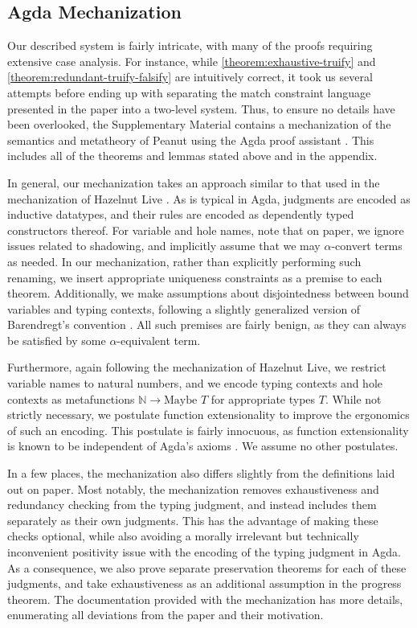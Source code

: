 \subsection{Agda Mechanization}
\label{sec:agda}

Our described system is fairly intricate, with many of the proofs
requiring extensive case analysis.
%
For instance, while \autoref{theorem:exhaustive-truify} and
\autoref{theorem:redundant-truify-falsify} are intuitively correct, it
took us several attempts before ending up with separating the match
constraint language presented in the paper into a two-level system.
%
%
Thus, to ensure
no details have been overlooked, the Supplementary Material contains a
mechanization of the semantics and metatheory of Peanut using the Agda
proof assistant \cite{norell:thesis}. This includes all of the
theorems and lemmas stated above and in the appendix.

In general, our mechanization takes an approach similar to that used in the mechanization of Hazelnut Live \cite{DBLP:journals/pacmpl/OmarVCH19}. As is typical in Agda, judgments are encoded as inductive datatypes, and their rules are encoded as dependently typed constructors thereof. For variable and hole names, note that on paper, we ignore issues related to shadowing, and implicitly assume that we may $\alpha$-convert terms as needed. In our mechanization, rather than explicitly performing such renaming, we insert appropriate uniqueness constraints as a premise to each theorem. Additionally, we make assumptions about disjointedness between bound variables and typing contexts, following a slightly generalized version of Barendregt’s convention \cite{DBLP:books/daglib/0067558, DBLP:conf/cade/UrbanBN07}. All such premises are fairly benign, as they can always be satisfied by some $\alpha$-equivalent term.

Furthermore, again following the mechanization of Hazelnut Live, we restrict variable names to natural numbers, and we encode typing contexts and hole contexts as metafunctions $\mathbb{N} \to \text{Maybe } T$ for appropriate types $T$. While not strictly necessary, we postulate function extensionality to improve the ergonomics of such an encoding. This postulate is fairly innocuous, as function extensionality is known to be independent of Agda’s axioms \cite{DBLP:conf/lics/AwodeyGS12}. We assume no other postulates.

In a few places, the mechanization also differs slightly from the definitions laid out on paper. Most notably, the mechanization removes exhaustiveness and redundancy checking from the typing judgment, and instead includes them separately as their own judgments. This has the advantage of making these checks optional, while also avoiding a morally irrelevant but technically inconvenient positivity issue with the encoding of the typing judgment in Agda. As a consequence, we also prove separate preservation theorems for each of these judgments, and take exhaustiveness as an additional assumption in the progress theorem. The documentation provided with the mechanization has more details, enumerating all deviations from the paper and their motivation.